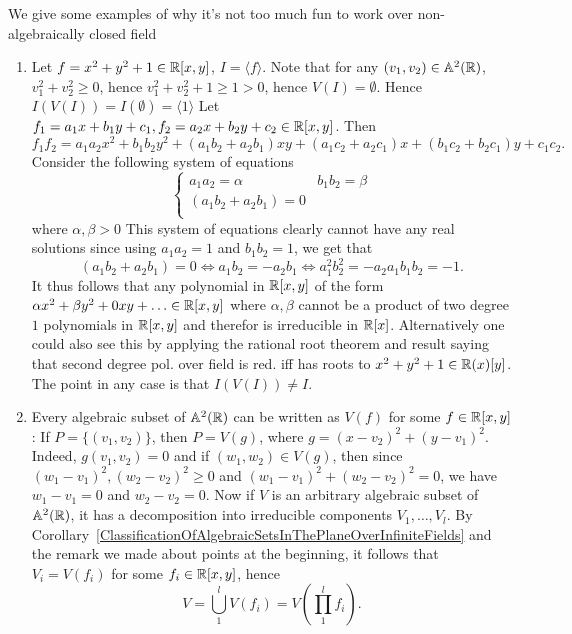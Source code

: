 \begin{example}
    We give some examples of why it's not too much fun to work over non-algebraically closed field
    \begin{enumerate}
    \item
        Let $f = x^2+y^2+1\in \mathbb{R}[x,y]$, $I=\langle f\rangle$.
        Note that for any $(v_1,v_2)\in \mathbb{A}^2(\mathbb{R})$, $v_1^2+v_2^2\geq 0$, hence $v_1^2+v_2^2+1\geq 1 >0$, hence $V(I)= \emptyset$. Hence $I(V(I))=I(\emptyset) = \langle 1 \rangle$
        Let $f_1=a_1x+b_1y+c_1,f_2=a_2x+b_2y+c_2\in \mathbb{R}[x,y]$. Then 
        $$f_1f_2=a_1a_2x^2+b_1b_2y^2+(a_1b_2+a_2b_1)xy+(a_1c_2+a_2c_1)x+(b_1c_2+b_2c_1)y+c_1c_2.$$
        Consider the following system of equations
        $$\begin{cases}
        a_1a_2 = \alpha & b_1b_2 = \beta\\
        (a_1b_2+a_2b_1) = 0\\  
        \end{cases}$$
        where $\alpha, \beta > 0$
        This system of equations clearly cannot have any real solutions since using $a_1a_2 = 1$ and $ b_1b_2 = 1$, we get that
        $$(a_1b_2+a_2b_1) = 0\iff a_1b_2 = -a_2b_1 \iff a_1^2b_2^2 = -a_2a_1b_1b_2 = -1.$$
        It thus follows that any polynomial in $\mathbb{R}[x,y]$ of the form $\alpha x^2+\beta y^2 + 0xy +\dots \in \mathbb{R}[x,y]$ where $\alpha,\beta$ cannot be a product of two degree $1$ polynomials in $\mathbb{R}[x,y]$ and therefor is irreducible in $\mathbb{R}[x]$. Alternatively one could also see this by applying the rational root theorem and {\Large result saying that second degree pol. over field is red. iff has roots} to $x^2+y^2+1\in \mathbb{R}(x)[y]$. \\
        The point in any case is that $I(V(I))\neq I$.
        \item Every algebraic subset of $\mathbb{A}^2(\mathbb{R})$ can be written as $V(f)$ for some $f\in \mathbb{R}[x,y]$: If $P=\{(v_1,v_2)\}$, then $P=V(g)$, where $g = (x-v_2)^2+(y-v_1)^2$. Indeed, $g(v_1,v_2)=0$ and if $(w_1,w_2)\in V(g)$, then since $(w_1-v_1)^2,(w_2-v_2)^2\geq 0$ and $(w_1-v_1)^2+(w_2-v_2)^2 =0$, we have $w_1-v_1=0$ and $w_2-v_2=0$. Now if $V$ is an arbitrary algebraic subset of $\mathbb{A}^2(\mathbb{R})$, it has a decomposition into irreducible components $V_1,\dots,V_l$. By Corollary~\ref{ClassificationOfAlgebraicSetsInThePlaneOverInfiniteFields} and the remark we made about points at the beginning, it follows that $V_i = V(f_i)$ for some $f_i\in \mathbb{R}[x,y]$, hence 
        $$V = \bigcup_1^l V(f_i) = V\left(\prod_1^l f_i\right).$$
        \end{enumerate}
\end{example}
